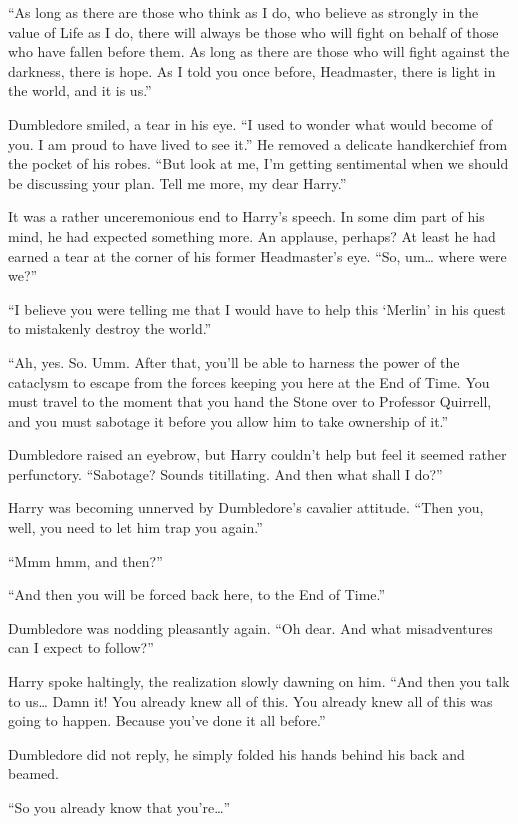 “As long as there are those who think as I do, who believe as strongly in the value of Life as I do, there will always be those who will fight on behalf of those who have fallen before them. As long as there are those who will fight against the darkness, there is hope. As I told you once before, Headmaster, there is light in the world, and it is us.”

Dumbledore smiled, a tear in his eye. “I used to wonder what would become of you. I am proud to have lived to see it.” He removed a delicate handkerchief from the pocket of his robes. “But look at me, I’m getting sentimental when we should be discussing your plan. Tell me more, my dear Harry.”

It was a rather unceremonious end to Harry’s speech. In some dim part of his mind, he had expected something more. An applause, perhaps? At least he had earned a tear at the corner of his former Headmaster’s eye. “So, um… where were we?”

“I believe you were telling me that I would have to help this ‘Merlin’ in his quest to mistakenly destroy the world.”

“Ah, yes. So. Umm. After that, you’ll be able to harness the power of the cataclysm to escape from the forces keeping you here at the End of Time. You must travel to the moment that you hand the Stone over to Professor Quirrell, and you must sabotage it before you allow him to take ownership of it.”

Dumbledore raised an eyebrow, but Harry couldn’t help but feel it seemed rather perfunctory. “Sabotage? Sounds titillating. And then what shall I do?”

Harry was becoming unnerved by Dumbledore’s cavalier attitude. “Then you, well, you need to let him trap you again.”

“Mmm hmm, and then?”

“And then you will be forced back here, to the End of Time.”

Dumbledore was nodding pleasantly again. “Oh dear. And what misadventures can I expect to follow?”

Harry spoke haltingly, the realization slowly dawning on him. “And then you talk to us… Damn it!  You already knew all of this. You already knew all of this was going to happen. Because you’ve done it all before.”

Dumbledore did not reply, he simply folded his hands behind his back and beamed.

“So you already know that you’re…”

